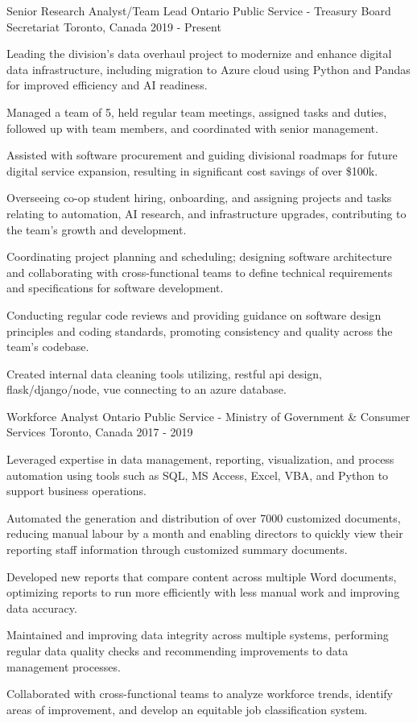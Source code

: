 \begin{cventries}
\cventry
	{Senior Research Analyst/Team Lead}
	{Ontario Public Service - Treasury Board Secretariat}
	{Toronto, Canada}
	{2019 - Present}
	{
		\begin{cvitems}
			\item Leading the division's data overhaul project to modernize and enhance digital data infrastructure, including migration to Azure cloud using Python and Pandas for improved efficiency and AI readiness.
			\item Managed a team of 5, held regular team meetings, assigned tasks and duties, followed up with team members, and coordinated with senior management. 
			\item  Assisted with software procurement and guiding divisional roadmaps for future digital service expansion, resulting in significant cost savings of over \$100k.
			\item Overseeing co-op student hiring, onboarding, and assigning projects and tasks relating to automation, AI research, and infrastructure upgrades, contributing to the team's growth and development.
			\item Coordinating project planning and scheduling; designing software architecture and collaborating with cross-functional teams to define technical requirements and specifications for software development.
			\item Conducting regular code reviews and providing guidance on software design principles and coding standards, promoting consistency and quality across the team's codebase.
			\item Created internal data cleaning tools utilizing, restful api design, flask/django/node, vue connecting to an azure database. 
		\end{cvitems}
	}

\cventry
	{Workforce Analyst}
	{Ontario Public Service - Ministry of Government \& Consumer Services}
	{Toronto, Canada}
	{2017 - 2019}
	{
		\begin{cvitems}
			\item Leveraged expertise in data management, reporting, visualization, and process automation using tools such as SQL, MS Access, Excel, VBA, and Python to support business operations.
			\item Automated the generation and distribution of over 7000 customized documents, reducing manual labour by a month and enabling directors to quickly view their reporting staff information through customized summary documents.
			\item Developed new reports that compare content across multiple Word documents, optimizing reports to run more efficiently with less manual work and improving data accuracy.
			\item Maintained and improving data integrity across multiple systems, performing regular data quality checks and recommending improvements to data management processes.
			\item Collaborated with cross-functional teams to analyze workforce trends, identify areas of improvement, and develop an equitable job classification system.
		\end{cvitems}
	}


\end{cventries}

